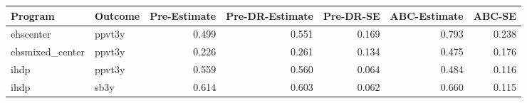 \begin{table}[ht]
\centering
\begin{tabular}{llrrrrr}
  \hline
Program & Outcome & Pre-Estimate & Pre-DR-Estimate & Pre-DR-SE & ABC-Estimate & ABC-SE \\ 
  \hline
ehscenter & ppvt3y & 0.499 & 0.551 & 0.169 & 0.793 & 0.238 \\ 
  ehsmixed\_center & ppvt3y & 0.226 & 0.261 & 0.134 & 0.475 & 0.176 \\ 
  ihdp & ppvt3y & 0.559 & 0.560 & 0.064 & 0.484 & 0.116 \\ 
  ihdp & sb3y & 0.614 & 0.603 & 0.062 & 0.660 & 0.115 \\ 
   \hline
\end{tabular}
\end{table}
